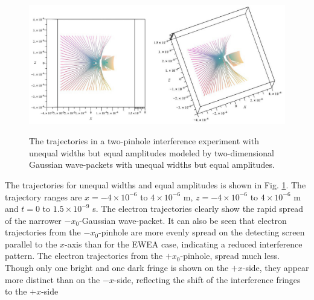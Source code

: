 \documentclass[12pt]{article}       %
\begin{document}
\begin{figure}[h]
\unitlength=1in
\hspace*{0.8in}\includegraphics[width=4.5in,height=2.36in]  {figure20.jpg}  
\caption{The trajectories in a two-pinhole interference experiment with unequal widths but equal amplitudes modeled by two-dimensional Gaussian wave-packets with  unequal widths but equal amplitudes.\label{TRAJEWEAUW}}
\end{figure}
The trajectories for unequal widths and equal amplitudes is shown in Fig.  \ref{TRAJEWEAUW}. The trajectory  ranges are $x=-4\times 10^{-6}$ to $4\times 10^{-6}$ m, $z=-4\times 10^{-6}$ to $4\times 10^{-6}$ m and $t=0$ to $1.5\times 10^{-9}$ s. The electron trajectories clearly show the rapid spread of the narrower $-x_0$-Gaussian wave-packet. It can also be seen that electron trajectories from the $-x_0$-pinhole are more evenly spread on the detecting screen parallel to the $x$-axis than for the EWEA case, indicating a reduced interference pattern. The electron trajectories from the  $+x_0$-pinhole, spread much less. Though only one bright and one dark fringe is shown on the $+x$-side, they appear more distinct than on the $-x$-side, reflecting the shift of the interference fringes to the $+x$-side
\end{document}
